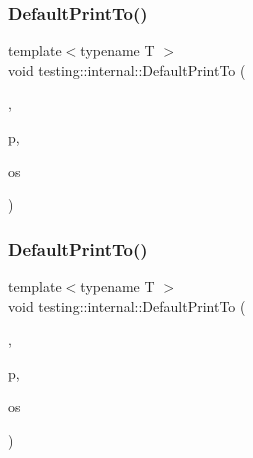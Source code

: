 \subsubsection{\texorpdfstring{DefaultPrintTo()}{DefaultPrintTo()}\hspace{0.1cm}{\footnotesize\ttfamily [2/4]}}
{\footnotesize\ttfamily template$<$typename T $>$ \\
void testing\+::internal\+::\+Default\+Print\+To (\begin{DoxyParamCaption}\item[{\mbox{\hyperlink{structtesting_1_1internal_1_1WrapPrinterType}{Wrap\+Printer\+Type}}$<$ \mbox{\hyperlink{namespacetesting_1_1internal_a17fb8f0125fa92404a249ed38a43faa4a8eaa6fff4a58832b30027df49f73dcbf}{k\+Print\+Pointer}} $>$}]{,  }\item[{T $\ast$}]{p,  }\item[{\+::std\+::ostream $\ast$}]{os }\end{DoxyParamCaption})}

\mbox{\label{namespacetesting_1_1internal_a7729c07abcae6c69b9b370c39db61409}} 
\subsubsection{\texorpdfstring{DefaultPrintTo()}{DefaultPrintTo()}\hspace{0.1cm}{\footnotesize\ttfamily [3/4]}}
{\footnotesize\ttfamily template$<$typename T $>$ \\
void testing\+::internal\+::\+Default\+Print\+To (\begin{DoxyParamCaption}\item[{\mbox{\hyperlink{structtesting_1_1internal_1_1WrapPrinterType}{Wrap\+Printer\+Type}}$<$ \mbox{\hyperlink{namespacetesting_1_1internal_a17fb8f0125fa92404a249ed38a43faa4a5a066cde30e276c6460ba10d123d0c2c}{k\+Print\+Function\+Pointer}} $>$}]{,  }\item[{T $\ast$}]{p,  }\item[{\+::std\+::ostream $\ast$}]{os }\end{DoxyParamCaption})}

\mbox{\label{namespacetesting_1_1internal_a72b1a69d96be8ea6382539f5c4fcac6d}} 
